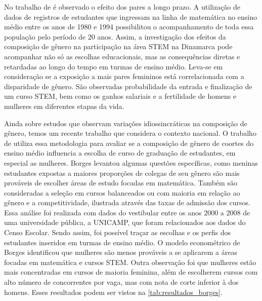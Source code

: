 No trabalho de \citet{Brene2020} é observado o efeito dos pares a longo prazo. A utilização de dados de registros de estudantes que ingressam na linha de matemática no ensino médio entre os anos de 1980 e 1994 possibilitou o acompanhamento de toda essa população pelo período de 20 anos. Assim, a investigação dos efeitos da composição de gênero na participação na área STEM na Dinamarca pode acompanhar não só as escolhas educacionais, mas as consequências diretas e retardadas ao longo do tempo em turmas de ensino médio. Leva-se em consideração se a exposição a mais pares femininos está correlacionada com a disparidade de gênero. São observadas probabilidade da entrada e finalização de um curso STEM, bem como os ganhos salariais e a fertilidade de homens e mulheres em diferentes etapas da vida.

Ainda sobre estudos que observam variações idiossincráticas na composição de gênero, temos um recente trabalho que considera o contexto nacional. O trabalho de \citet{Borges2021} utiliza essa metodologia para avaliar se a composição de gênero de coortes do ensino médio influencia a escolha de curso de graduação de estudantes, em especial as mulheres. Borges levantou algumas questões específicas, como meninas estudantes expostas a maiores proporções de colegas de seu gênero são mais prováveis de escolher áreas de estudo focadas em matemática. Também são consideradas a seleção em cursos balanceados ou com maioria em relação ao gênero e a competitividade, ilustrada através das taxas de admissão dos cursos. Essa análise foi realizada com dados do vestibular entre os anos 2000 a 2008 de uma universidade pública, a UNICAMP, que foram relacionados aos dados do Censo Escolar. Sendo assim, foi possível traçar as escolhas e os perfis dos estudantes inseridos em turmas de ensino médio. O modelo econométrico de Borges identificou que mulheres são menos prováveis a se aplicarem a áreas focadas em matemática e cursos STEM. Outra observação foi que mulheres estão mais concentradas em cursos de maioria feminina, além de escolherem cursos com alto número de concorrentes por vaga, mas com nota de corte inferior à dos homens. Esses resultados podem ser vistos na \autoref{tab:resultados_borges}.

